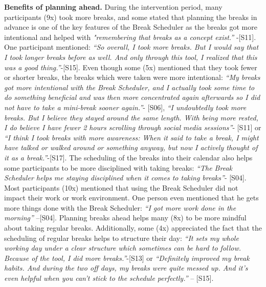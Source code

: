 \documentclass{hasel_thesis}
\begin{document}
\textbf{Benefits of planning ahead.} During the intervention period, many participants (9x) took more breaks, and some stated that planning the breaks in advance is one of the key features of the Break Scheduler as the breaks got more intentional and helped with \textit{"remembering that breaks as a concept exist.” }-[S11]. One participant mentioned: \textit{“So overall, I took more breaks. But I would say that I took longer breaks before as well. And only through this tool, I realized that this was a good thing.”}-[S15]. Even though some (5x) mentioned that they took fewer or shorter breaks, the breaks which were taken were more intentional: \textit{“My breaks got more intentional with the Break Scheduler, and I actually took some time to do something beneficial and was then more concentrated again afterwards so I did not have to take a mini-break sooner again.”}- [S06], \textit{“I undoubtedly took more breaks. But I believe they stayed around the same length. With being more rested, I do believe I have fewer 2 hours scrolling through social media sessions”}- [S11] or \textit{“I think I took breaks with more awareness: When it said to take a break, I might have talked or walked around or something anyway, but now I actively thought of it as a break.”}-[S17]. The scheduling of the breaks into their calendar also helps some participants to be more disciplined with taking breaks: \textit{“The Break Scheduler helps me staying disciplined when it comes to taking breaks”}- [S04]. Most participants (10x) mentioned that using the Break Scheduler did not impact their work or work environment. One person even mentioned that he gets more things done with the Break Scheduler: \textit{“I got more work done in the morning” }–[S04]. Planning breaks ahead helps many (8x) to be more mindful about taking regular breaks. Additionally, some (4x) appreciated the fact that the scheduling of regular breaks helps to structure their day: \textit{“It sets my whole working day under a clear structure which sometimes can be hard to follow. Because of the tool, I did more breaks.”}-[S13] or \textit{“Definitely improved my break habits. And during the two off days, my breaks were quite messed up. And it's even helpful when you can't stick to the schedule perfectly.”} – [S15]. 
\end{document}
